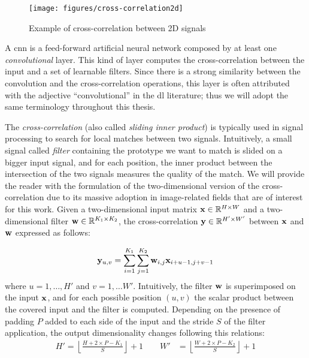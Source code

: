 \begin{figure}
    \centering
    \texttt{[image: figures/cross-correlation2d]}
    \caption{Example of cross-correlation between 2D signals}
    \label{fig:back:2d-cross-corr}
\end{figure}

A \gls{cnn} is a feed-forward artificial neural network composed by at least one \emph{convolutional} layer.
This kind of layer computes the cross-correlation between the input and a set of learnable filters.
Since there is a strong similarity between the convolution and the cross-correlation operations, this layer is often attributed with the adjective ``convolutional'' in the \gls{dl} literature;
thus we will adopt the same terminology throughout this thesis.

The \emph{cross-correlation} (also called \emph{sliding inner product}) is typically used in signal processing to search for local matches between two signals.
Intuitively, a small signal called \emph{filter} containing the prototype we want to match is slided on a bigger input signal, and for each position, the inner product between the intersection of the two signals measures the quality of the match.
We will provide the reader with the formulation of the two-dimensional version of the cross-correlation due to its massive adoption in image-related fields that are of interest for this work.
Given a two-dimensional input matrix $\mathbf{x} \in \mathbb{R}^{H \times W}$ and a two-dimensional filter $\mathbf{w} \in \mathbb{R}^{K_1 \times K_2}$, %
the cross-correlation $\mathbf{y} \in \mathbb{R}^{H' \times W'}$ between $\mathbf{x}$ and $\mathbf{w}$ expressed as follows:

\begin{equation}\label{eq:back:cross-correlation}
    \mathbf{y}_{u,v} = \sum_{i=1}^{K_1} \sum_{j=1}^{K_2} \mathbf{w}_{i,j} \mathbf{x}_{i+u-1,j+v-1}
\end{equation}
%
where $u = 1, \dots, H'$ and $v = 1, \dots W'$.
Intuitively, the filter $\mathbf{w}$ is superimposed on the input $\mathbf{x}$, and for each possible position $(u,v)$ the scalar product between the covered input and the filter is computed.
Depending on the presence of padding $P$ added to each side of the input and the stride $S$ of the filter application, the output dimensionality changes following this relations:
\begin{align*}
    H' = \left \lfloor \frac{H + 2 \times P - K_1}{S} \right \rfloor + 1 \qquad
    W' &= \left \lfloor \frac{W + 2 \times P - K_2}{S} \right \rfloor + 1
\end{align*}


